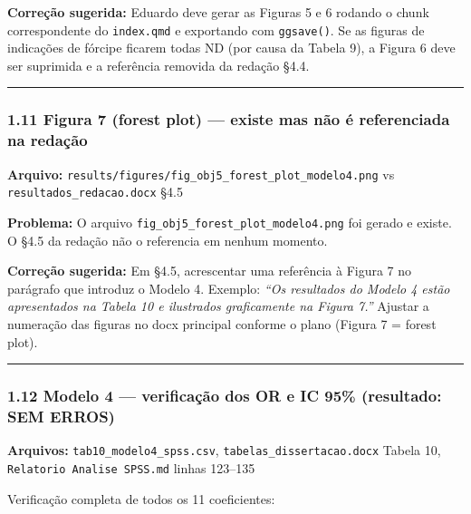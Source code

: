 \documentclass[
]{article}
\begin{document}
\textbf{Correção sugerida:} Eduardo deve gerar as Figuras 5 e 6 rodando
o chunk correspondente do \texttt{index.qmd} e exportando com
\texttt{ggsave()}. Se as figuras de indicações de fórcipe ficarem todas
ND (por causa da Tabela 9), a Figura 6 deve ser suprimida e a referência
removida da redação §4.4.

\begin{center}\rule{0.5\linewidth}{0.5pt}\end{center}

\hypertarget{figura-7-forest-plot-existe-mas-nuxe3o-uxe9-referenciada-na-redauxe7uxe3o}{%
\subsubsection{1.11 Figura 7 (forest plot) --- existe mas não é
referenciada na
redação}\label{figura-7-forest-plot-existe-mas-nuxe3o-uxe9-referenciada-na-redauxe7uxe3o}}

\textbf{Arquivo:}
\texttt{results/figures/fig\_obj5\_forest\_plot\_modelo4.png} vs
\texttt{resultados\_redacao.docx} §4.5

\textbf{Problema:} O arquivo
\texttt{fig\_obj5\_forest\_plot\_modelo4.png} foi gerado e existe. O
§4.5 da redação não o referencia em nenhum momento.

\textbf{Correção sugerida:} Em §4.5, acrescentar uma referência à Figura
7 no parágrafo que introduz o Modelo 4. Exemplo: \emph{``Os resultados
do Modelo 4 estão apresentados na Tabela 10 e ilustrados graficamente na
Figura 7.''} Ajustar a numeração das figuras no docx principal conforme
o plano (Figura 7 = forest plot).

\begin{center}\rule{0.5\linewidth}{0.5pt}\end{center}

\hypertarget{modelo-4-verificauxe7uxe3o-dos-or-e-ic-95-resultado-sem-erros}{%
\subsubsection{1.12 Modelo 4 --- verificação dos OR e IC 95\%
(resultado: SEM
ERROS)}\label{modelo-4-verificauxe7uxe3o-dos-or-e-ic-95-resultado-sem-erros}}

\textbf{Arquivos:} \texttt{tab10\_modelo4\_spss.csv},
\texttt{tabelas\_dissertacao.docx} Tabela 10,
\texttt{Relatorio\ Analise\ SPSS.md} linhas 123--135

Verificação completa de todos os 11 coeficientes:
\end{document}
